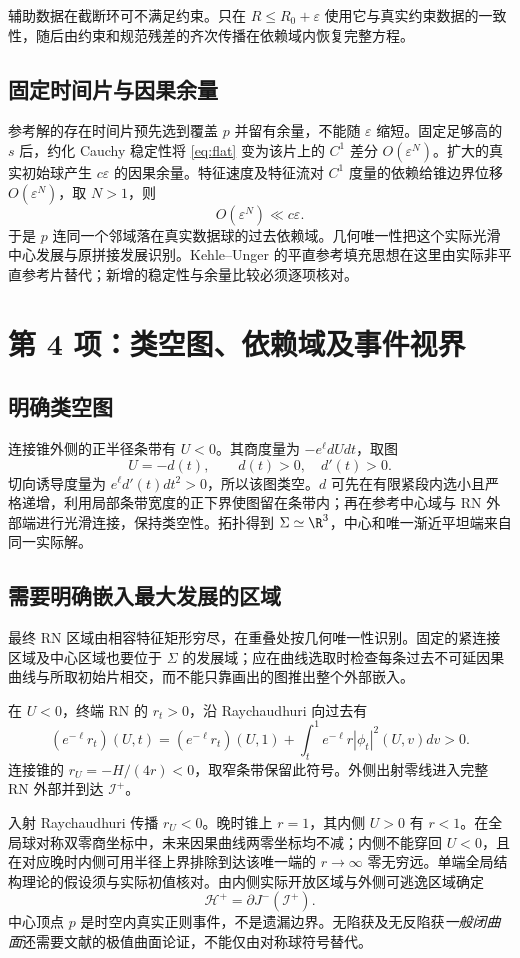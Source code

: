 辅助数据在截断环可不满足约束。只在 $R\le R_0+\varepsilon$ 使用它与真实约束数据的一致性，随后由约束和规范残差的齐次传播在依赖域内恢复完整方程。

\subsection{固定时间片与因果余量}
参考解的存在时间片预先选到覆盖 $p$ 并留有余量，不能随 $\varepsilon$ 缩短。固定足够高的 $s$ 后，约化 Cauchy 稳定性将 \eqref{eq:flat} 变为该片上的 $C^1$ 差分 $O(\varepsilon^N)$。扩大的真实初始球产生 $c\varepsilon$ 的因果余量。特征速度及特征流对 $C^1$ 度量的依赖给锥边界位移 $O(\varepsilon^N)$，取 $N>1$，则
\[
O(\varepsilon^N)\ll c\varepsilon.
\]
于是 $p$ 连同一个邻域落在真实数据球的过去依赖域。几何唯一性把这个实际光滑中心发展与原拼接发展识别。Kehle--Unger 的平直参考填充思想在这里由实际非平直参考片替代；新增的稳定性与余量比较必须逐项核对。

\section{第 4 项：类空图、依赖域及事件视界}
\subsection{明确类空图}
连接锥外侧的正半径条带有 $U<0$。其商度量为 $-e^\ell dUdt$，取图
\[
U=-d(t),\qquad d(t)>0,\quad d'(t)>0.
\]
切向诱导度量为 $e^\ell d'(t)dt^2>0$，所以该图类空。$d$ 可先在有限紧段内选小且严格递增，利用局部条带宽度的正下界使图留在条带内；再在参考中心域与 RN 外部端进行光滑连接，保持类空性。拓扑得到 $\Sigma\simeq\R^3$，中心和唯一渐近平坦端来自同一实际解。

\subsection{需要明确嵌入最大发展的区域}
最终 RN 区域由相容特征矩形穷尽，在重叠处按几何唯一性识别。固定的紧连接区域及中心区域也要位于 $\Sigma$ 的发展域；应在曲线选取时检查每条过去不可延因果曲线与所取初始片相交，而不能只靠画出的图推出整个外部嵌入。

在 $U<0$，终端 RN 的 $r_t>0$，沿 Raychaudhuri 向过去有
\[
(e^{-\ell}r_t)(U,t)=(e^{-\ell}r_t)(U,1)
+\int_t^1e^{-\ell}r|\phi_t|^2(U,v)dv>0.
\]
连接锥的 $r_U=-H/(4r)<0$，取窄条带保留此符号。外侧出射零线进入完整 RN 外部并到达 $\mathcal I^+$。

入射 Raychaudhuri 传播 $r_U<0$。晚时锥上 $r=1$，其内侧 $U>0$ 有 $r<1$。在全局球对称双零商坐标中，未来因果曲线两零坐标均不减；内侧不能穿回 $U<0$，且在对应晚时内侧可用半径上界排除到达该唯一端的 $r\to\infty$ 零无穷远。单端全局结构理论的假设须与实际初值核对。由内侧实际开放区域与外侧可逃逸区域确定
\[
\mathcal H^+=\partial J^-(\mathcal I^+).
\]
中心顶点 $p$ 是时空内真实正则事件，不是遗漏边界。无陷获及无反陷获\emph{一般闭曲面}还需要文献的极值曲面论证，不能仅由对称球符号替代。

